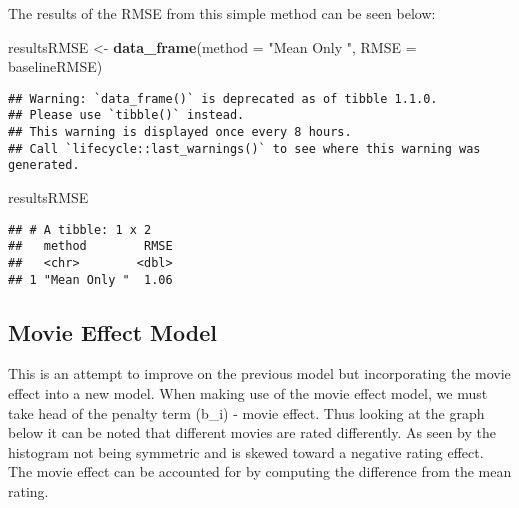 \documentclass[
]{article}
\newenvironment{Shaded}{\begin{snugshade}}{\end{snugshade}}
\newcommand{\DataTypeTok}[1]{\textcolor[rgb]{0.13,0.29,0.53}{#1}}
\newcommand{\DecValTok}[1]{\textcolor[rgb]{0.00,0.00,0.81}{#1}}
\newcommand{\KeywordTok}[1]{\textcolor[rgb]{0.13,0.29,0.53}{\textbf{#1}}}
\newcommand{\NormalTok}[1]{#1}
\newcommand{\OperatorTok}[1]{\textcolor[rgb]{0.81,0.36,0.00}{\textbf{#1}}}
\newcommand{\StringTok}[1]{\textcolor[rgb]{0.31,0.60,0.02}{#1}}
\begin{document}
The results of the RMSE from this simple method can be seen below:

\begin{Shaded}
\begin{Highlighting}[]
\NormalTok{resultsRMSE <-}\StringTok{ }\KeywordTok{data_frame}\NormalTok{(}\DataTypeTok{method =} \StringTok{"Mean Only "}\NormalTok{, }\DataTypeTok{RMSE =}\NormalTok{ baselineRMSE)}
\end{Highlighting}
\end{Shaded}

\begin{verbatim}
## Warning: `data_frame()` is deprecated as of tibble 1.1.0.
## Please use `tibble()` instead.
## This warning is displayed once every 8 hours.
## Call `lifecycle::last_warnings()` to see where this warning was generated.
\end{verbatim}

\begin{Shaded}
\begin{Highlighting}[]
\NormalTok{resultsRMSE}
\end{Highlighting}
\end{Shaded}

\begin{verbatim}
## # A tibble: 1 x 2
##   method        RMSE
##   <chr>        <dbl>
## 1 "Mean Only "  1.06
\end{verbatim}

\hypertarget{movie-effect-model}{%
\subsection{Movie Effect Model}\label{movie-effect-model}}

This is an attempt to improve on the previous model but incorporating
the movie effect into a new model. When making use of the movie effect
model, we must take head of the penalty term (b\_i) - movie effect. Thus
looking at the graph below it can be noted that different movies are
rated differently. As seen by the histogram not being symmetric and is
skewed toward a negative rating effect. The movie effect can be
accounted for by computing the difference from the mean rating.

\begin{Shaded}
\end{Shaded}
\end{document}
